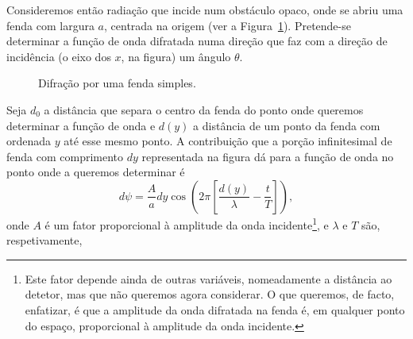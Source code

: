 Consideremos então radiação que incide num obstáculo opaco, onde se abriu uma
fenda com largura $a$, centrada na origem (ver a Figura~\ref{fig:oof110}).
Pretende-se determinar a função de onda difratada numa direção que faz com
a direção de incidência (o eixo dos $x$, na figura) um ângulo $\theta$.
\begin{figure}[htb]
    \begin{center}
        \small
{}
\end{center}
\caption{Difração por uma fenda simples.\label{fig:oof110}}
\end{figure}
Seja $d_0$ a distância que separa o centro da fenda do ponto onde queremos
determinar a função de onda e $d(y)$ a distância de um ponto da fenda com
ordenada $y$ até esse mesmo ponto. A contribuição que a porção infinitesimal de
fenda com comprimento $dy$ representada na figura dá para a função de onda no
ponto onde a queremos determinar é 
\begin{equation*}
    d\psi = \frac{A}{a}dy\cos\left(2\pi\left[\frac{d(y)}{\lambda}-\frac{t}{T}
    \right]\right),
\end{equation*}
onde $A$ é um fator proporcional à amplitude da onda incidente\footnote{Este
    fator depende ainda de outras variáveis, nomeadamente a distância ao
    detetor, mas que não queremos agora considerar. O que queremos, de facto,
    enfatizar, é que a amplitude da onda difratada na fenda é, em qualquer ponto
do espaço, proporcional à amplitude da onda incidente.}, e $\lambda$ e $T$ são, respetivamente,
